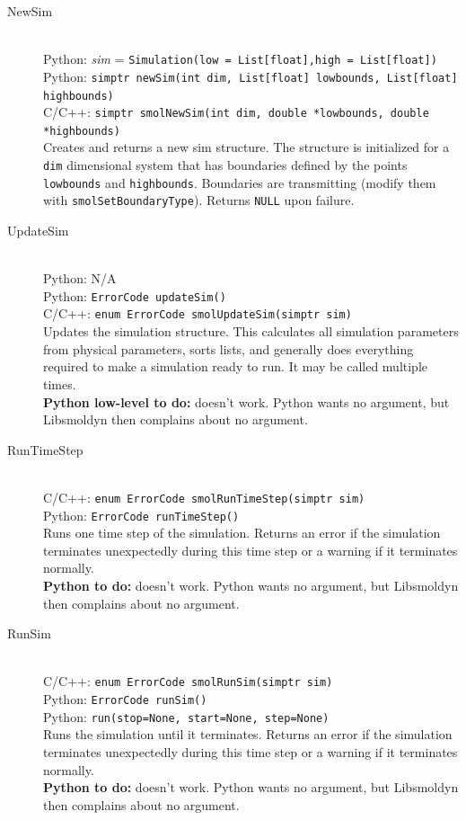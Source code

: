 \documentclass {scrbook}
\newcommand {\ttt} {\texttt}
\begin{document}
\begin{description}

\item[NewSim]
\hfill \\
Python: \textit{sim} = \ttt{Simulation(low = List[float],high = List[float])}\\
Python: \ttt{simptr newSim(int dim, List[float] lowbounds, List[float] highbounds)}\\
C/C++: \ttt{simptr smolNewSim(int dim, double *lowbounds, double *highbounds)}\\
Creates and returns a new sim structure. The structure is initialized for a \ttt{dim} dimensional system that has boundaries defined by the points \ttt{lowbounds} and \ttt{highbounds}. Boundaries are transmitting (modify them with \ttt{smolSetBoundaryType}). Returns \ttt{NULL} upon failure.

\item[UpdateSim]
\hfill \\
Python: N/A\\
Python: \ttt{ErrorCode updateSim()}\\
C/C++: \ttt{enum ErrorCode smolUpdateSim(simptr sim)}\\
Updates the simulation structure. This calculates all simulation parameters from physical parameters, sorts lists, and generally does everything required to make a simulation ready to run. It may be called multiple times.\\
\textbf{Python low-level to do:} doesn't work. Python wants no argument, but Libsmoldyn then complains about no argument.

\item[RunTimeStep]
\hfill \\
C/C++: \ttt{enum ErrorCode smolRunTimeStep(simptr sim)}\\
Python: \ttt{ErrorCode runTimeStep()}\\
Runs one time step of the simulation. Returns an error if the simulation terminates unexpectedly during this time step or a warning if it terminates normally.\\
\textbf{Python to do:} doesn't work. Python wants no argument, but Libsmoldyn then complains about no argument.

\item[RunSim]
\hfill \\
C/C++: \ttt{enum ErrorCode smolRunSim(simptr sim)}\\
Python: \ttt{ErrorCode runSim()}\\
Python: \ttt{run(stop=None, start=None, step=None)}\\
Runs the simulation until it terminates. Returns an error if the simulation terminates unexpectedly during this time step or a warning if it terminates normally.\\
\textbf{Python to do:} doesn't work. Python wants no argument, but Libsmoldyn then complains about no argument.


\end{description}
\end{document}
